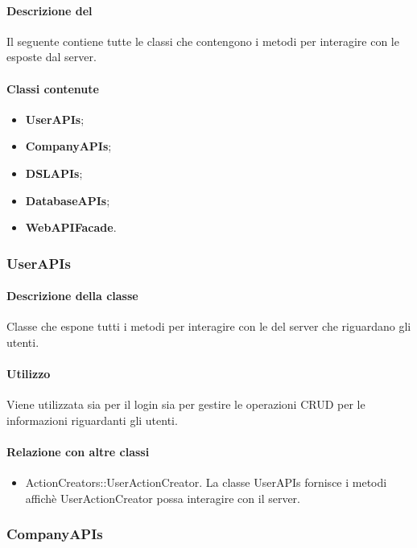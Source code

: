 \paragraph*{Descrizione del }
Il seguente  contiene tutte le classi che contengono i metodi per interagire con le  esposte dal server. 
\paragraph*{Classi contenute}
\begin{itemize}
\item \textbf{UserAPIs};
\item \textbf{CompanyAPIs};
\item \textbf{DSLAPIs};
\item \textbf{DatabaseAPIs};
\item \textbf{WebAPIFacade}.
\end{itemize}

\subsubsection{UserAPIs}
\paragraph*{Descrizione della classe}
Classe che espone tutti i metodi per interagire con le  del server che riguardano gli utenti.

\paragraph*{Utilizzo}
Viene utilizzata sia per il login sia per gestire le operazioni CRUD per le informazioni riguardanti gli utenti.

\paragraph*{Relazione con altre classi}
\begin{itemize}
\item ActionCreators::UserActionCreator. La classe UserAPIs fornisce i metodi affichè UserActionCreator possa interagire con il server.
\end{itemize}

\subsubsection{CompanyAPIs}
